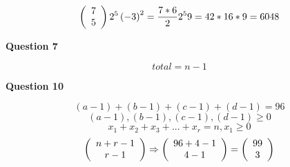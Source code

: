\documentclass[11pt]{article}
\begin{document}
$$ \left( {\begin{array}{*{20}c} 7 \\ 5 \\ \end{array}} \right)2^5\left(-3\right)^2 = \frac{7*6}{2} 2^5  9 = 42 * 16 * 9 = {6048} $$

\textbf{Question 7}

$$total = n-1$$

\textbf{Question 10}

$$\left(a-1\right)+\left(b-1\right)+\left(c-1\right)+\left(d-1\right) = 96 $$
$$\left(a-1\right),\left(b-1\right),\left(c-1\right),\left(d-1\right) \geq 0$$
$$x_1 + x_2 + x_3 + ... + x_r = n , x_1 \geq 0$$ 
$$\left( {\begin{array}{*{20}c} n+r-1 \\ r-1 \\ \end{array}} \right) \Rightarrow \left( {\begin{array}{*{20}c} 96+4-1 \\ 4-1 \\ \end{array}} \right) = \left( {\begin{array}{*{20}c} 99 \\ 3 \\ \end{array}} \right)$$
 
\end{document}
